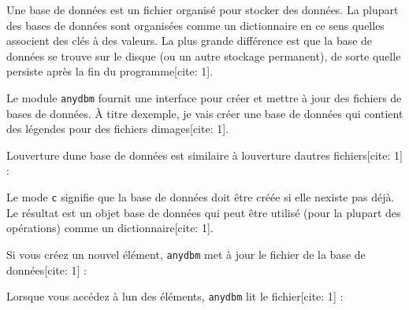 Une base de données est un fichier organisé pour stocker des données. La
plupart des bases de données sont organisées comme un dictionnaire en ce
sens qu\textquotesingle elles associent des clés à des valeurs. La plus
grande différence est que la base de données se trouve sur le disque (ou
un autre stockage permanent), de sorte qu\textquotesingle elle persiste
après la fin du programme{[}cite: 1{]}.

Le module \texttt{anydbm} fournit une interface pour créer et mettre à
jour des fichiers de bases de données. À titre
d\textquotesingle exemple, je vais créer une base de données qui
contient des légendes pour des fichiers d\textquotesingle images{[}cite:
1{]}.

L\textquotesingle ouverture d\textquotesingle une base de données est
similaire à l\textquotesingle ouverture d\textquotesingle autres
fichiers{[}cite: 1{]} :

\begin{Shaded}
\begin{Highlighting}[]
\OperatorTok{\textgreater{}\textgreater{}\textgreater{}} 
\OperatorTok{\textgreater{}\textgreater{}\textgreater{}}\OperatorTok{=}\NormalTok{(}\NormalTok{, }\NormalTok{)}
\end{Highlighting}
\end{Shaded}

Le mode \texttt{\textquotesingle{}c\textquotesingle{}} signifie que la
base de données doit être créée si elle n\textquotesingle existe pas
déjà. Le résultat est un objet base de données qui peut être utilisé
(pour la plupart des opérations) comme un dictionnaire{[}cite: 1{]}.

Si vous créez un nouvel élément, \texttt{anydbm} met à jour le fichier
de la base de données{[}cite: 1{]} :

\begin{Shaded}
\begin{Highlighting}[]
\OperatorTok{\textgreater{}\textgreater{}\textgreater{}}\NormalTok{ db[}\NormalTok{] }\OperatorTok{=} 
\end{Highlighting}
\end{Shaded}

Lorsque vous accédez à l\textquotesingle un des éléments,
\texttt{anydbm} lit le fichier{[}cite: 1{]} :

